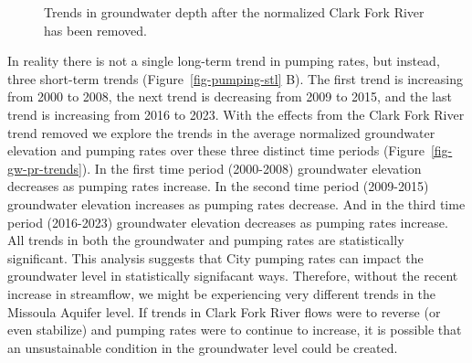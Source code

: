 \documentclass[
  letterpaper,
  DIV=11,
  numbers=noendperiod]{scrartcl}
\begin{document}
\begin{figure}


\caption{\label{fig-gw-qremoved}Trends in groundwater depth after the
normalized Clark Fork River has been removed.}

\end{figure}%

In reality there is not a single long-term trend in pumping rates, but
instead, three short-term trends (Figure~\ref{fig-pumping-stl} B). The
first trend is increasing from 2000 to 2008, the next trend is
decreasing from 2009 to 2015, and the last trend is increasing from 2016
to 2023. With the effects from the Clark Fork River trend removed we
explore the trends in the average normalized groundwater elevation and
pumping rates over these three distinct time periods
(Figure~\ref{fig-gw-pr-trends}). In the first time period (2000-2008)
groundwater elevation decreases as pumping rates increase. In the second
time period (2009-2015) groundwater elevation increases as pumping rates
decrease. And in the third time period (2016-2023) groundwater elevation
decreases as pumping rates increase. All trends in both the groundwater
and pumping rates are statistically significant. This analysis suggests
that City pumping rates can impact the groundwater level in
statistically signifacant ways. Therefore, without the recent increase
in streamflow, we might be experiencing very different trends in the
Missoula Aquifer level. If trends in Clark Fork River flows were to
reverse (or even stabilize) and pumping rates were to continue to
increase, it is possible that an unsustainable condition in the
groundwater level could be created.
\end{document}
